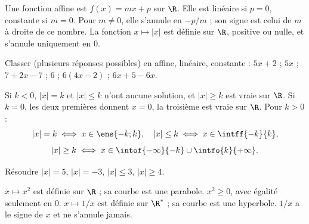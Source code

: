 \begin{keypoint}[Définitions]
Une fonction affine est $f(x)=mx+p$ sur $\R$. Elle est linéaire si $p=0$, constante si $m=0$. Pour $m\ne0$, elle s'annule en $-p/m$ ; son signe est celui de $m$ à droite de ce nombre.
La fonction $x\mapsto|x|$ est définie sur $\R$, positive ou nulle, et s'annule uniquement en $0$.
\end{keypoint}
\begin{example}Classer (plusieurs réponses possibles) en affine, linéaire, constante : $5x+2$ ; $5x$ ; $7+2x-7$ ; $6$ ; $6(4x-2)$ ; $6x+5-6x$.\end{example}
\begin{center}\end{center}
\begin{keypoint}
Si $k<0$, $|x|=k$ et $|x|\leq k$ n'ont aucune solution, et $|x|\geq k$ est vraie sur $\R$. Si $k=0$, les deux premières donnent $x=0$, la troisième est vraie sur $\R$. Pour $k>0$ :
\[|x|=k\iff x\in\ens{-k;k},\quad |x|\leq k\iff x\in\intff{-k}{k},\]
\[|x|\geq k\iff x\in\intof{-\infty}{-k}\cup\intfo{k}{+\infty}.\]
\end{keypoint}
\begin{example}Résoudre $|x|=5$, $|x|=-3$, $|x|\leq3$, $|x|\geq4$.\end{example}
\begin{keypoint}
$x\mapsto x^2$ est définie sur $\R$ ; sa courbe est une parabole. $x^2\geq0$, avec égalité seulement en $0$.
$x\mapsto1/x$ est définie sur $\R^*$ ; sa courbe est une hyperbole. $1/x$ a le signe de $x$ et ne s'annule jamais.
\end{keypoint}
\begin{center}
\end{center}
